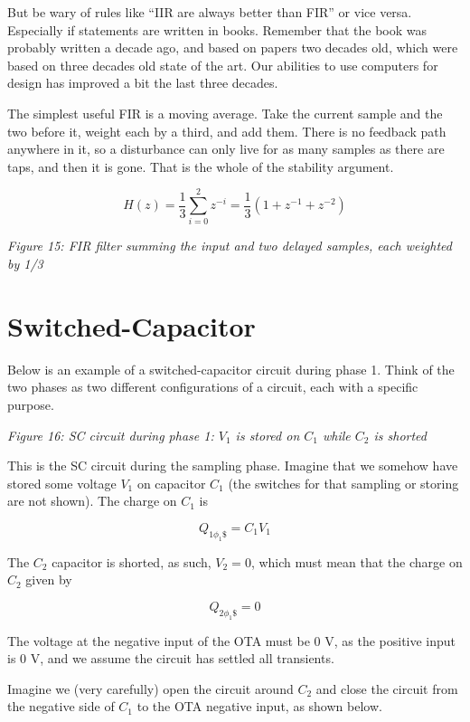But be wary of rules like ``IIR are always better than FIR'' or vice
versa. Especially if statements are written in books. Remember that the
book was probably written a decade ago, and based on papers two decades
old, which were based on three decades old state of the art. Our
abilities to use computers for design has improved a bit the last three
decades.

The simplest useful FIR is a moving average. Take the current sample and
the two before it, weight each by a third, and add them. There is no
feedback path anywhere in it, so a disturbance can only live for as many
samples as there are taps, and then it is gone. That is the whole of the
stability argument.

\[ H(z) = \frac{1}{3}\sum_{i=0}^2 z^{-i} = \frac{1}{3}\left(1 + z^{-1} + z^{-2}\right)\]


{
\centering
{}
}

\emph{Figure 15: FIR filter summing the input and two delayed samples,
each weighted by 1/3}

\section{Switched-Capacitor}\label{switched-capacitor-1}

Below is an example of a switched-capacitor circuit during phase 1.
Think of the two phases as two different configurations of a circuit,
each with a specific purpose.


{
\centering
{}
}

\emph{Figure 16: SC circuit during phase 1: \(V_1\) is stored on \(C_1\)
while \(C_2\) is shorted}

This is the SC circuit during the sampling phase. Imagine that we
somehow have stored some voltage \(V_1\) on capacitor \(C_1\) (the
switches for that sampling or storing are not shown). The charge on
\(C_1\) is

\[Q_{1\phi_1\$} = C_1 V_1\]

The \(C_2\) capacitor is shorted, as such, \(V_2 = 0\), which must mean
that the charge on \(C_2\) given by

\[Q_{2\phi_1\$} = 0\]

The voltage at the negative input of the OTA must be 0 V, as the
positive input is 0 V, and we assume the circuit has settled all
transients.

Imagine we (very carefully) open the circuit around \(C_2\) and close
the circuit from the negative side of \(C_1\) to the OTA negative input,
as shown below.


